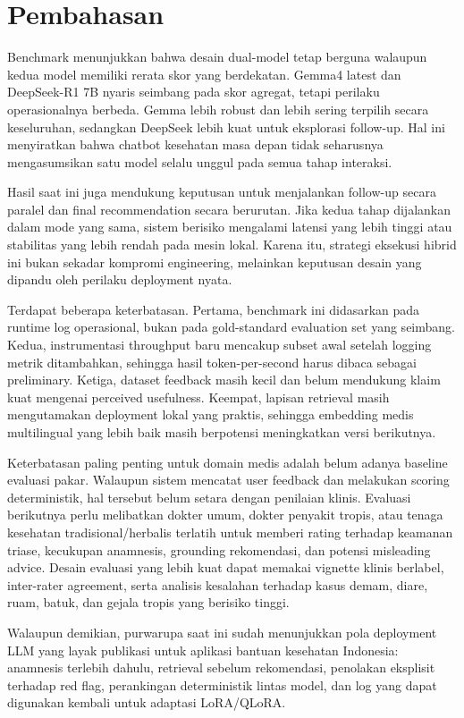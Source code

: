 \documentclass[conference]{IEEEtran}
\begin{document}
\section{Pembahasan}
Benchmark menunjukkan bahwa desain dual-model tetap berguna walaupun kedua model memiliki rerata skor yang berdekatan. Gemma4 latest dan DeepSeek-R1 7B nyaris seimbang pada skor agregat, tetapi perilaku operasionalnya berbeda. Gemma lebih robust dan lebih sering terpilih secara keseluruhan, sedangkan DeepSeek lebih kuat untuk eksplorasi follow-up. Hal ini menyiratkan bahwa chatbot kesehatan masa depan tidak seharusnya mengasumsikan satu model selalu unggul pada semua tahap interaksi.

Hasil saat ini juga mendukung keputusan untuk menjalankan follow-up secara paralel dan final recommendation secara berurutan. Jika kedua tahap dijalankan dalam mode yang sama, sistem berisiko mengalami latensi yang lebih tinggi atau stabilitas yang lebih rendah pada mesin lokal. Karena itu, strategi eksekusi hibrid ini bukan sekadar kompromi engineering, melainkan keputusan desain yang dipandu oleh perilaku deployment nyata.

Terdapat beberapa keterbatasan. Pertama, benchmark ini didasarkan pada runtime log operasional, bukan pada gold-standard evaluation set yang seimbang. Kedua, instrumentasi throughput baru mencakup subset awal setelah logging metrik ditambahkan, sehingga hasil token-per-second harus dibaca sebagai preliminary. Ketiga, dataset feedback masih kecil dan belum mendukung klaim kuat mengenai perceived usefulness. Keempat, lapisan retrieval masih mengutamakan deployment lokal yang praktis, sehingga embedding medis multilingual yang lebih baik masih berpotensi meningkatkan versi berikutnya.

Keterbatasan paling penting untuk domain medis adalah belum adanya baseline evaluasi pakar. Walaupun sistem mencatat user feedback dan melakukan scoring deterministik, hal tersebut belum setara dengan penilaian klinis. Evaluasi berikutnya perlu melibatkan dokter umum, dokter penyakit tropis, atau tenaga kesehatan tradisional/herbalis terlatih untuk memberi rating terhadap keamanan triase, kecukupan anamnesis, grounding rekomendasi, dan potensi misleading advice. Desain evaluasi yang lebih kuat dapat memakai vignette klinis berlabel, inter-rater agreement, serta analisis kesalahan terhadap kasus demam, diare, ruam, batuk, dan gejala tropis yang berisiko tinggi.

Walaupun demikian, purwarupa saat ini sudah menunjukkan pola deployment LLM yang layak publikasi untuk aplikasi bantuan kesehatan Indonesia: anamnesis terlebih dahulu, retrieval sebelum rekomendasi, penolakan eksplisit terhadap red flag, perankingan deterministik lintas model, dan log yang dapat digunakan kembali untuk adaptasi LoRA/QLoRA.
\end{document}
